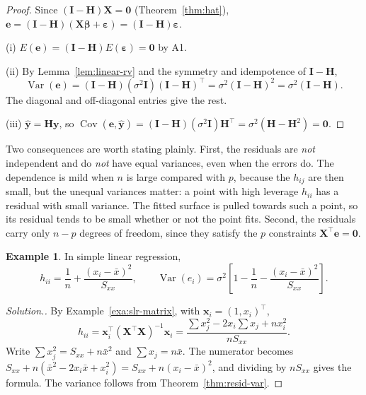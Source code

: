 \documentclass[11pt,a4paper]{article}
\numberwithin{equation}{section}
\theoremstyle{definition}
\newtheorem{exa}[thm]{Example}
\newenvironment{solution}
  {\renewcommand{\qedsymbol}{}\begin{proof}[\textit{Solution}.]}
  {\end{proof}}
\begin{document}
\begin{proof}
Since $(\mathbf{I} - \mathbf{H})\mathbf{X} = \mathbf{0}$ (Theorem~\ref{thm:hat}),
$\mathbf{e} = (\mathbf{I} - \mathbf{H})(\mathbf{X}\boldsymbol\beta + \boldsymbol\varepsilon)
= (\mathbf{I} - \mathbf{H})\boldsymbol\varepsilon$.

(i) $E(\mathbf{e}) = (\mathbf{I} - \mathbf{H})E(\boldsymbol\varepsilon) = \mathbf{0}$ by A1.

(ii) By Lemma~\ref{lem:linear-rv} and the symmetry and idempotence of $\mathbf{I} - \mathbf{H}$,
\[
\operatorname{Var}(\mathbf{e}) = (\mathbf{I} - \mathbf{H})(\sigma^2\mathbf{I})(\mathbf{I} - \mathbf{H})^\top
= \sigma^2(\mathbf{I} - \mathbf{H})^2 = \sigma^2(\mathbf{I} - \mathbf{H}) .
\]
The diagonal and off-diagonal entries give the rest.

(iii) $\hat{\mathbf{y}} = \mathbf{Hy}$, so
$\operatorname{Cov}(\mathbf{e}, \hat{\mathbf{y}}) = (\mathbf{I} - \mathbf{H})(\sigma^2\mathbf{I})\mathbf{H}^\top
= \sigma^2(\mathbf{H} - \mathbf{H}^2) = \mathbf{0}$.
\end{proof}

Two consequences are worth stating plainly. First, the residuals are \emph{not} independent
and do \emph{not} have equal variances, even when the errors do. The dependence is mild
when $n$ is large compared with $p$, because the $h_{ij}$ are then small, but the unequal
variances matter: a point with high leverage $h_{ii}$ has a residual with small variance.
The fitted surface is pulled towards such a point, so its residual tends to be small
whether or not the point fits. Second, the residuals carry only $n - p$ degrees of freedom,
since they satisfy the $p$ constraints $\mathbf{X}^\top\mathbf{e} = \mathbf{0}$.

\begin{exa}\label{exa:slr-leverage}
In simple linear regression,
\[
h_{ii} = \frac{1}{n} + \frac{(x_i - \bar x)^2}{S_{xx}} ,
\qquad
\operatorname{Var}(e_i) = \sigma^2\left[1 - \frac{1}{n} - \frac{(x_i - \bar x)^2}{S_{xx}}\right] .
\]
\end{exa}

\begin{solution}
By Example~\ref{exa:slr-matrix}, with $\mathbf{x}_i = (1, x_i)^\top$,
\[
h_{ii} = \mathbf{x}_i^\top(\mathbf{X}^\top\mathbf{X})^{-1}\mathbf{x}_i
= \frac{\sum x_j^2 - 2x_i\sum x_j + n x_i^2}{nS_{xx}} .
\]
Write $\sum x_j^2 = S_{xx} + n\bar x^2$ and $\sum x_j = n\bar x$. The numerator becomes
$S_{xx} + n(\bar x^2 - 2x_i\bar x + x_i^2) = S_{xx} + n(x_i - \bar x)^2$, and dividing by
$nS_{xx}$ gives the formula. The variance follows from Theorem~\ref{thm:resid-var}.
\end{solution}
\end{document}
